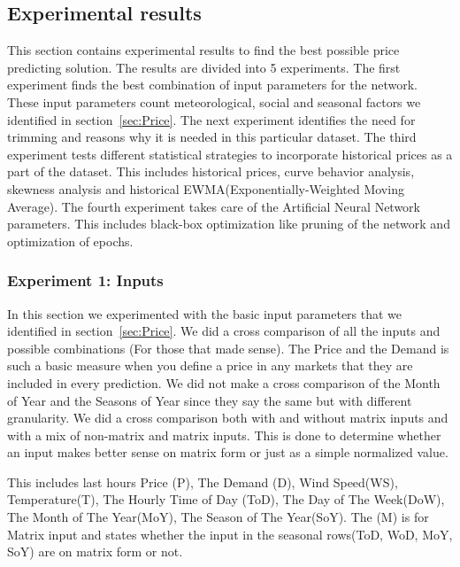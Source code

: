 \subsection{Experimental results}
This section contains experimental results to find the best possible price predicting solution. The results are divided into 5 experiments. The first experiment finds the best combination of input parameters for the network. These input parameters count meteorological, social and seasonal factors we identified in section~\ref{sec:Price}. The next experiment identifies the need for trimming and reasons why it is needed in this particular dataset. The third experiment tests different statistical strategies to incorporate historical prices as a part of the dataset. This includes historical prices, curve behavior analysis, skewness analysis and historical EWMA(Exponentially-Weighted Moving Average). The fourth experiment takes care of the Artificial Neural Network parameters. This includes black-box optimization like pruning of the network and optimization of epochs.

\subsubsection{Experiment 1: Inputs}
In this section we experimented with the basic input parameters that we identified in section~\ref{sec:Price}. We did a cross comparison of all the inputs and possible combinations (For those that made sense). The Price and the Demand is such a basic measure when you define a price in any markets that they are included in every prediction. We did not make a cross comparison of the Month of Year and the Seasons of Year since they say the same but with different granularity. We did a cross comparison both with and without matrix inputs and with a mix of non-matrix and matrix inputs. This is done to determine whether an input makes better sense on matrix form or just as a simple normalized value. 

This includes last hours Price (P), The Demand (D), Wind Speed(WS), Temperature(T), The Hourly Time of Day (ToD), The Day of The Week(DoW), The Month of The Year(MoY), The Season of The Year(SoY). The (M) is for Matrix input and states whether the input in the seasonal rows(ToD, WoD, MoY, SoY) are on matrix form or not.

